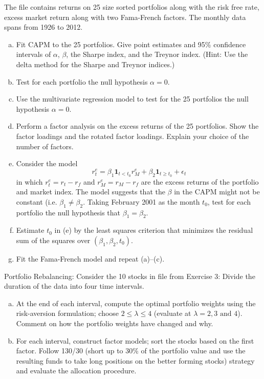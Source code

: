 \prob The file  contains returns on 25 size sorted portfolios along with the risk free rate, excess market return along with two Fama-French factors. The monthly data spans from 1926 to 2012.
	\begin{enumerate}[(a)]
	\item Fit CAPM to the 25 portfolios. Give point estimates and 95\% confidence intervals of $\alpha$, $\beta$, the Sharpe index, and the Treynor index. (Hint: Use the delta method for the Sharpe and Treynor indices.)
	\item Test for each portfolio the null hypothesis $\alpha= 0$.
	\item Use the multivariate regression model to test for the 25 portfolios the null hypothesis $\alpha=0$.
	\item Perform a factor analysis on the excess returns of the 25 portfolios. Show the factor loadings and the rotated factor loadings. Explain your choice of the number of factors.
	\item Consider the model
		\[
		r_t^e= \beta_1 \mathbf{1}_{t<t_0} r_M^e + \beta_2 \mathbf{1}_{t\geq t_0} + \epsilon_t
		\]
	in which $r_t^e=r_t-r_f$ and $r_M^e=r_M-r_f$ are the excess returns of the portfolio and market index. The model suggests that the $\beta$ in the CAPM might not be constant (i.e. $\beta_1\neq\beta_2$. Taking February 2001 as the month $t_0$, test for each portfolio the null hypothesis that $\beta_1=\beta_2$.
	\item Estimate $t_0$ in (e) by the least squares criterion that minimizes the residual sum of the squares over $(\beta_1,\beta_2,t_0)$.
	\item Fit the Fama-French model and repeat (a)--(c). \twomedskip
	\end{enumerate}


\prob Portfolio Rebalancing: Consider the 10 stocks in file from Exercise 3: Divide the duration of the data into four time intervals.
    \begin{enumerate}[(a)]
    \item At the end of each interval, compute the optimal portfolio weights using the risk-aversion formulation; choose $2 \leq \lambda \leq 4$ (evaluate at $\lambda = 2, 3 \text{ and } 4$). Comment on how the portfolio weights have changed and why.
    \item For each interval, construct factor models; sort the stocks based on the first factor. Follow 130/30 (short up to 30\% of the portfolio value and use the resulting funds to take long positions on the better forming stocks) strategy and evaluate the allocation procedure. \twomedskip
    \end{enumerate}
    

